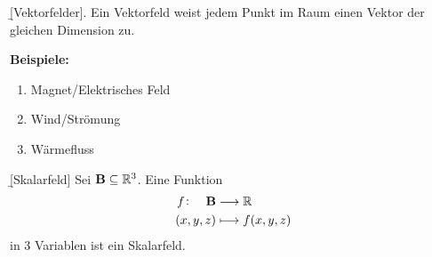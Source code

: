 \documentclass[12pt]{article}
\begin{document}
\begin{defn}{\b{[Vektorfelder].}} Ein Vektorfeld weist jedem Punkt im Raum einen Vektor der gleichen Dimension zu.

    \textbf{Beispiele:}
    \begin{enumerate}[label=(\roman*)]
        \item Magnet/Elektrisches Feld
        \item Wind/Strömung
        \item Wärmefluss
    \end{enumerate}
\end{defn}

\begin{figure}[htbp!]
    \centering
\end{figure}

\begin{defn}{\b{[Skalarfeld]}} Sei $\mathbf{B}\subseteq\mathbb{R}^3$. Eine Funktion
    \begin{align}
        f\colon\quad \mathbf{B} & \longrightarrow\mathbb{R}    \\
        (x,y,z)                 & \longmapsto f(x,y,z)
    \end{align}
    in 3 Variablen ist ein Skalarfeld.
\end{defn}\vspace*{1em}
\end{document}
